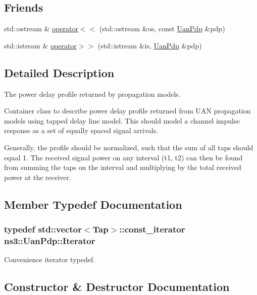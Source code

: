 \subsection*{Friends}
\begin{DoxyCompactItemize}
\item 
std\+::ostream \& \hyperlink{classns3_1_1UanPdp_a7d16891fdc63f163d39d8db0a4f8223e}{operator$<$$<$} (std\+::ostream \&os, const \hyperlink{classns3_1_1UanPdp}{Uan\+Pdp} \&pdp)
\item 
std\+::istream \& \hyperlink{classns3_1_1UanPdp_a3f98e956084cff477566cae55b1d670e}{operator$>$$>$} (std\+::istream \&is, \hyperlink{classns3_1_1UanPdp}{Uan\+Pdp} \&pdp)
\end{DoxyCompactItemize}


\subsection{Detailed Description}
The power delay profile returned by propagation models.

Container class to describe power delay profile returned from U\+AN propagation models using tapped delay line model. This should model a channel impulse response as a set of equally spaced signal arrivals.

Generally, the profile should be normalized, such that the sum of all taps should equal 1. The received signal power on any interval (t1, t2) can then be found from summing the taps on the interval and multiplying by the total received power at the receiver. 

\subsection{Member Typedef Documentation}
\subsubsection[{\texorpdfstring{Iterator}{Iterator}}]{\setlength{\rightskip}{0pt plus 5cm}typedef std\+::vector$<${\bf Tap}$>$\+::const\+\_\+iterator {\bf ns3\+::\+Uan\+Pdp\+::\+Iterator}}\hypertarget{classns3_1_1UanPdp_a640e546e31696f75f9e638513b38ceba}{}\label{classns3_1_1UanPdp_a640e546e31696f75f9e638513b38ceba}
Convenience iterator typedef. 

\subsection{Constructor \& Destructor Documentation}
